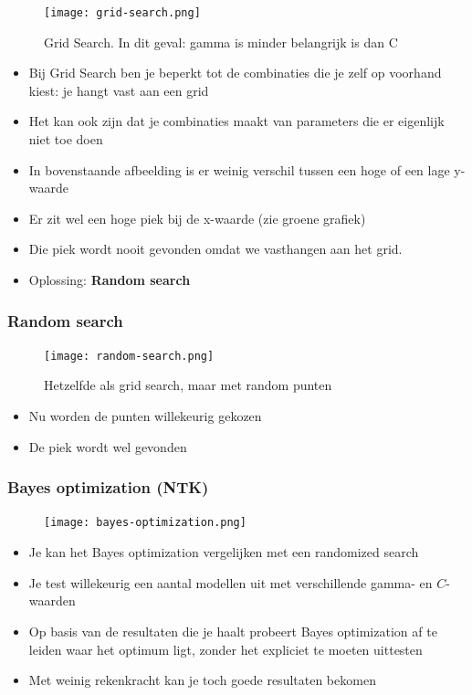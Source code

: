 \documentclass{article}
\begin{document}
\begin{figure}[H]
    \centering
    \texttt{[image: grid-search.png]}
    \caption{Grid Search. In dit geval: gamma is minder belangrijk is dan C}
\end{figure}

\begin{itemize}
    \item Bij Grid Search ben je beperkt tot de combinaties die je zelf op voorhand kiest: je hangt vast aan een grid
    \item Het kan ook zijn dat je combinaties maakt van parameters die er eigenlijk niet toe doen
    \item In bovenstaande afbeelding is er weinig verschil tussen een hoge of een lage y-waarde
    \item Er zit wel een hoge piek bij de x-waarde (zie groene grafiek)
    \item Die piek wordt nooit gevonden omdat we vasthangen aan het grid.
    \item Oplossing: \textbf{Random search}
\end{itemize}


\subsubsection{Random search}

\begin{figure}[H]
    \centering
    \texttt{[image: random-search.png]}
    \caption{Hetzelfde als grid search, maar met random punten}
\end{figure}

\begin{itemize}
    \item Nu worden de punten willekeurig gekozen
    \item De piek wordt wel gevonden
\end{itemize}

\subsubsection{Bayes optimization (NTK)}

\begin{figure}[H]
    \centering
    \texttt{[image: bayes-optimization.png]}
    \caption{}
\end{figure}

\begin{itemize}
    \item Je kan het Bayes optimization vergelijken met een randomized search
    \item Je test willekeurig een aantal modellen uit met verschillende gamma- en $C$-waarden
    \item Op basis van de resultaten die je haalt probeert Bayes optimization af te leiden waar het optimum ligt, zonder het expliciet te moeten uittesten
    \item Met weinig rekenkracht kan je toch goede resultaten bekomen
\end{itemize}
\end{document}

